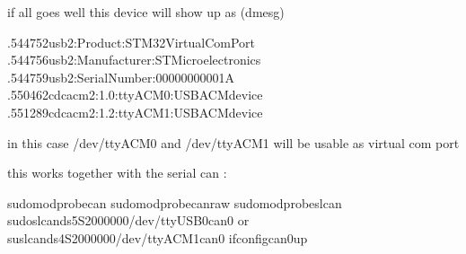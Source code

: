\documentclass[letterpaper,10pt,english]{sphinxmanual}
\begin{document}
\sphinxAtStartPar
if all goes well this device will show up as  (dmesg)

\begin{sphinxVerbatim}[commandchars=\\\{\}]
\PYG{o}{[}.544752\PYG{o}{]}usb\PYGZhy{}2:Product:STM32VirtualComPort
\PYG{o}{[}.544756\PYG{o}{]}usb\PYGZhy{}2:Manufacturer:STMicroelectronics
\PYG{o}{[}.544759\PYG{o}{]}usb\PYGZhy{}2:SerialNumber:00000000001A
\PYG{o}{[}.550462\PYG{o}{]}cdc\PYGZus{}acm\PYGZhy{}2:1.0:ttyACM0:USBACMdevice
\PYG{o}{[}.551289\PYG{o}{]}cdc\PYGZus{}acm\PYGZhy{}2:1.2:ttyACM1:USBACMdevice
\end{sphinxVerbatim}

\sphinxAtStartPar
in this case /dev/ttyACM0 and /dev/ttyACM1 will be usable as virtual com port

\sphinxAtStartPar
this works together with the serial can :

\sphinxAtStartPar
{}

\begin{sphinxVerbatim}[commandchars=\\\{\}]
sudomodprobecan
sudomodprobecan\PYGZhy{}raw
sudomodprobeslcan
sudoslcand\PYGZhy{}s5\PYGZhy{}S2000000/dev/ttyUSB0can0
or
suslcand\PYGZhy{}s4\PYGZhy{}S2000000/dev/ttyACM1can0
ifconfigcan0up
\end{sphinxVerbatim}

\sphinxAtStartPar
{}

\noindent{}
\end{document}
